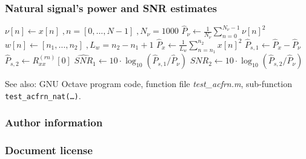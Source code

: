 \documentclass[11pt,aspectratio=169]{beamer}
\def\PresCopyrightType{ccby} %
\begin{document}
	\begin{frame}
		\frametitle{\appendixname{} \textemdash{} Natural signal's power and SNR estimates}\label{app:powestnat}
		\begin{algorithmic}
			\State $\nu[n] \gets x[n] \; , n = [0,...,N-1] \; , N_{\nu} = 1000$
			\State $\hat{P}_{\nu} \gets \frac{1}{N_{\nu}} \sum\limits_{n=0}^{N_{\nu}-1} \nu[n]^2$
			\State $w[n] \gets [n_1,\ldots,n_2] \; , L_w = n_2 - n_1 + 1$
			\State $\hat{P}_x \gets \frac{1}{L_w} \sum\limits_{n=n_1}^{n_2} x[n]^2$
			\State $\hat{P}_{s,1} \gets \hat{P}_x - \hat{P}_{\nu}$
			\State $\hat{P}_{s,2} \gets R_{xx}^{(rn)}[0]$
			\vspace*{.5em}
			\State $\hat{SNR}_1 \gets 10 \cdot \log_{10} (\hat{P}_{s,1} / \hat{P}_{\nu})$
			\vspace*{.25em}
			\State $\hat{SNR}_2 \gets 10 \cdot \log_{10} (\hat{P}_{s,2} / \hat{P}_{\nu})$
		\end{algorithmic}
		\vspace*{.5em}
		\small See also: GNU Octave program code\cite{progcode}, function file \textsl{test\_acfrn.m}, sub-function \texttt{test\_acfrn\_nat(\ldots)}.
	\end{frame}
	\begin{frame}[noframenumbering]
		\frametitle{\appendixname{} \textemdash{} Author information}
		\RIPauthorinfo{}
	\end{frame}
	\begin{frame}[noframenumbering]
		\frametitle{\appendixname{} \textemdash{} Document license}
		\expandafter\RIPcopyrightinfo\expandafter{\PresCopyrightType}
	\end{frame}
\end{document}
